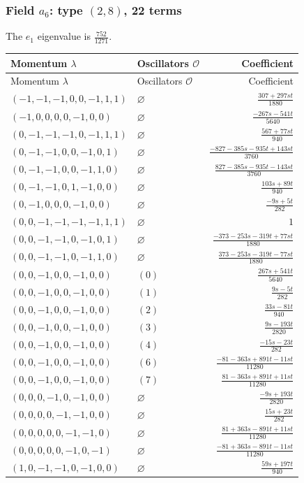\subsubsection{\texorpdfstring{Field $a_{6}$: type $(2,8)$, 22 terms}{Field a6: type (2,8), 22 terms}}
The $e_1$ eigenvalue is $\frac{752}{1271}$. 
\begingroup\scriptsize\setlength{\tabcolsep}{3pt}\renewcommand{\arraystretch}{1.35}
\begin{longtable}{@{}llr@{}}
\toprule Momentum $\lambda$&Oscillators $\mathcal O$&Coefficient\\\midrule\endfirsthead
\toprule Momentum $\lambda$&Oscillators $\mathcal O$&Coefficient\\\midrule\endhead
\bottomrule\endfoot
$(-1,-1,-1,0,0,-1,1,1)$ & $\varnothing$ & $\frac{307+297st}{1880}$\\
$(-1,0,0,0,0,-1,0,0)$ & $\varnothing$ & $\frac{-267s-541t}{5640}$\\
$(0,-1,-1,-1,0,-1,1,1)$ & $\varnothing$ & $\frac{567+77st}{940}$\\
$(0,-1,-1,0,0,-1,0,1)$ & $\varnothing$ & $\frac{-827-385s-935t+143st}{3760}$\\
$(0,-1,-1,0,0,-1,1,0)$ & $\varnothing$ & $\frac{827-385s-935t-143st}{3760}$\\
$(0,-1,-1,0,1,-1,0,0)$ & $\varnothing$ & $\frac{103s+89t}{940}$\\
$(0,-1,0,0,0,-1,0,0)$ & $\varnothing$ & $\frac{-9s+5t}{282}$\\
$(0,0,-1,-1,-1,-1,1,1)$ & $\varnothing$ & $1$\\
$(0,0,-1,-1,0,-1,0,1)$ & $\varnothing$ & $\frac{-373-253s-319t+77st}{1880}$\\
$(0,0,-1,-1,0,-1,1,0)$ & $\varnothing$ & $\frac{373-253s-319t-77st}{1880}$\\
$(0,0,-1,0,0,-1,0,0)$ & $(0)$ & $\frac{267s+541t}{5640}$\\
$(0,0,-1,0,0,-1,0,0)$ & $(1)$ & $\frac{9s-5t}{282}$\\
$(0,0,-1,0,0,-1,0,0)$ & $(2)$ & $\frac{33s-81t}{940}$\\
$(0,0,-1,0,0,-1,0,0)$ & $(3)$ & $\frac{9s-193t}{2820}$\\
$(0,0,-1,0,0,-1,0,0)$ & $(4)$ & $\frac{-15s-23t}{282}$\\
$(0,0,-1,0,0,-1,0,0)$ & $(6)$ & $\frac{-81-363s+891t-11st}{11280}$\\
$(0,0,-1,0,0,-1,0,0)$ & $(7)$ & $\frac{81-363s+891t+11st}{11280}$\\
$(0,0,0,-1,0,-1,0,0)$ & $\varnothing$ & $\frac{-9s+193t}{2820}$\\
$(0,0,0,0,-1,-1,0,0)$ & $\varnothing$ & $\frac{15s+23t}{282}$\\
$(0,0,0,0,0,-1,-1,0)$ & $\varnothing$ & $\frac{81+363s-891t+11st}{11280}$\\
$(0,0,0,0,0,-1,0,-1)$ & $\varnothing$ & $\frac{-81+363s-891t-11st}{11280}$\\
$(1,0,-1,-1,0,-1,0,0)$ & $\varnothing$ & $\frac{59s+197t}{940}$\\
\end{longtable}
\endgroup
